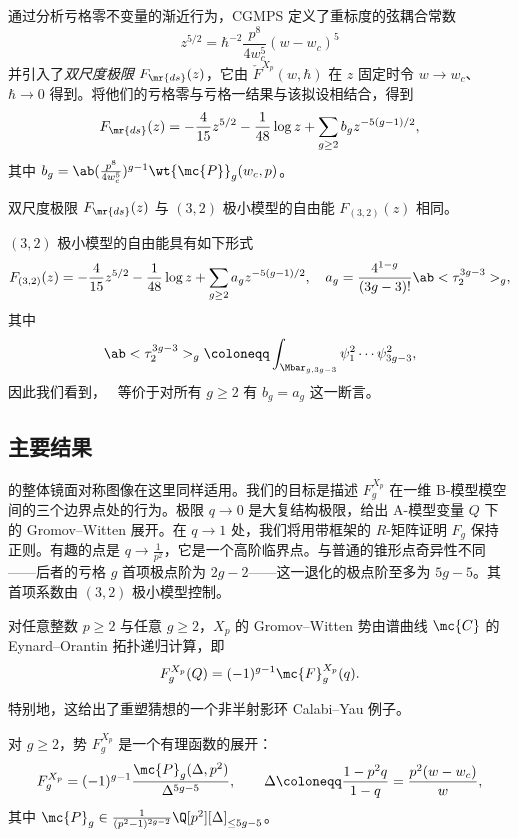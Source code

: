通过分析亏格零不变量的渐近行为，CGMPS 定义了重标度的弦耦合常数
\[ z^{5/2} = \hbar^{-2} \frac{p^8}{4w_c^5}(w-w_c)^5 \]
并引入了\textit{双尺度极限} \(F_{\mr{ds}}(z)\)，它由 \(\check{F}^{X_p}(w,\hbar)\) 在 \(z\) 固定时令 \(w \to w_c\)、\(\hbar \to 0\) 得到。将他们的亏格零与亏格一结果与该拟设相结合，得到
\[ F_{\mr{ds}}(z) = -\frac{4}{15}z^{5/2} - \frac{1}{48}\log z + \sum_{g \geq 2} b_g z^{-5(g-1)/2}, \]
其中 \(b_g = \ab(\frac{p^8}{4w_c^5})^{g-1}\wt{\mc{P}}_g(w_c,p)\)。

\begin{conj}%
\label{conj:cgmps}
    双尺度极限 \(F_{\mr{ds}}(z)\) 与 \((3,2)\) 极小模型的自由能 \(F_{(3,2)}(z)\) 相同。
\end{conj}

\((3,2)\) 极小模型的自由能具有如下形式
\[ F_{(3,2)}(z) = -\frac{4}{15}z^{5/2} - \frac{1}{48}\log z + \sum_{g\geq2} a_g z^{-5(g-1)/2}, \quad a_g = \frac{4^{1-g}}{(3g-3)!}\ab<\tau_2^{3g-3}>_g, \]
其中
\[ \ab<\tau_2^{3g-3}>_g \coloneqq \int_{\Mbar_{g,3g-3}} \psi_1^2 \cdots \psi_{3g-3}^2, \]
因此我们看到，~ 等价于对所有 \(g \geq 2\) 有 \(b_g = a_g\) 这一断言。

\subsection{主要结果}%
\label{sub:The main results (Guo local P1)}

 的整体镜面对称图像在这里同样适用。我们的目标是描述 \(F_g^{X_p}\) 在一维 B-模型模空间的三个边界点处的行为。极限 \(q \to 0\) 是大复结构极限，给出 A-模型变量 \(Q\) 下的 Gromov--Witten 展开。在 \(q \to 1\) 处，我们将用带框架的 \(R\)-矩阵证明 \(F_g\) 保持正则。有趣的点是 \(q \to \frac{1}{p^2}\)，它是一个高阶临界点。与普通的锥形点奇异性不同——后者的亏格 \(g\) 首项极点阶为 \(2g-2\)——这一退化的极点阶至多为 \(5g-5\)。其首项系数由 \((3,2)\) 极小模型控制。

\begin{thm}%
\label{thm:local P1 mirror symmetry}
    对任意整数 \(p \geq 2\) 与任意 \(g \geq 2\)，\(X_p\) 的 Gromov--Witten 势由谱曲线 \(\mc{C}\) 的 Eynard--Orantin 拓扑递归计算，即
    \[ F_g^{X_p}(Q) = (-1)^{g-1}\mc{F}_g^{X_p}(q). \]
\end{thm}

特别地，这给出了重塑猜想的一个非半射影环 Calabi--Yau 例子。

\begin{thm}%
\label{thm:local P1 rationality}
    对 \(g \geq 2\)，势 \(F_g^{X_p}\) 是一个有理函数的展开：
    \[ F_g^{X_p} = (-1)^{g-1}\frac{\mc{P}_g(\Delta,p^2)}{\Delta^{5g-5}}, \qquad \Delta \coloneqq \frac{1-p^2q}{1-q} = \frac{p^2(w-w_c)}{w}, \]
    其中 \(\mc{P}_g \in \frac{1}{(p^2-1)^{2g-2}}\Q[p^2][\Delta]_{\leq 5g-5}\)。
\end{thm}

